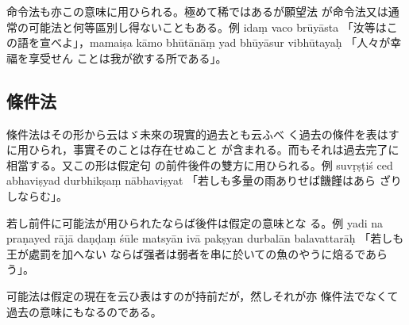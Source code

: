 命令法も亦この意味に用ひられる。極めて稀ではあるが願望法
が命令法又は通常の可能法と何等區別し得ないこともある。例
idaṃ vaco brūyāsta 「汝等はこの語を宣べよ」，mamaiṣa kāmo
bhūtānāṃ yad bhūyāsur vibhūtayaḥ 「人々が幸福を享受せん
ことは我が欲する所である」。

\subsection{條件法}
\numberParagraph
條件法はその形から云はゞ未來の現實的過去とも云ふべ
く過去の條件を表はすに用ひられ，事實そのことは存在せぬこと
が含まれる。而もそれは過去完了に相當する。又この形は假定句
の前件後件の雙方に用ひられる。例 suvṛṣṭiś ced abhaviṣyad
durbhikṣaṃ nābhaviṣyat 「若しも多量の雨ありせば饑饉はあら
ざりしならむ」。

若し前件に可能法が用ひられたならば後件は假定の意味とな
る。例 yadi na praṇayed rājā daṇḍaṃ śūle matsyān ivā\-%
pakṣyan durbalān balavattarāḥ 「若しも王が處罰を加へない
ならば强者は弱者を串に於いての魚のやうに焙るであらう」。

可能法は假定の現在を云ひ表はすのが持前だが，然しそれが亦
條件法でなくて過去の意味にもなるのである。

\newpage
\theendnotes


